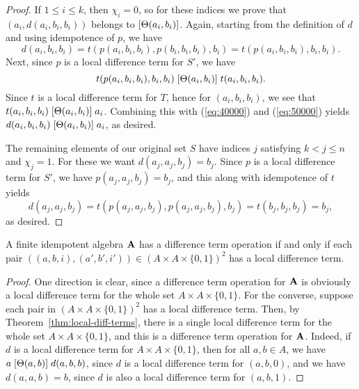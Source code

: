 \begin{proof}
If $1\leq i \leq k$, then $\chi_i =0$, so for these indices we prove
that $(a_i, d(a_i,b_i,b_i))$ belongs to $[\Theta(a_i,b_i)]$.
Again, starting from the definition of $d$ and using idempotence of $p$, we have
\begin{equation}
  \label{eq:40000}
  d(a_i,b_i,b_i) =
  t(p(a_i,b_i,b_i), p(b_i,b_i,b_i), b_i)=
  t(p(a_i,b_i,b_i), b_i, b_i).
\end{equation}
Next, since $p$ is a local difference term for $S'$, we have
\begin{equation}
  \label{eq:50000}
  t(p(a_i,b_i,b_i), b_i, b_i)
 \Comr{\Cg(a_i,b_i)}
 t(a_i, b_i, b_i).
\end{equation}
Since $t$ is a local difference term for $T$, hence for
$(a_i, b_i, b_i)$,  %
we see that 
$t(a_i, b_i, b_i) \mathrel{[\Theta(a_i,b_i)]} a_i$.
Combining this with (\ref{eq:40000}) and (\ref{eq:50000}) yields
$d(a_i,b_i,b_i) \mathrel{[\Theta(a_i,b_i)]} a_i$,
as desired.

The remaining elements of our original set $S$
have indices $j$ satisfying $k<j\leq n$ and $\chi_j = 1$.
For these we want $d(a_j,a_j,b_j) = b_j$.
Since $p$ is a local difference term for $S'$, we have
$p(a_j,a_j,b_j) = b_j$, and this along with idempotence of $t$ yields
\[ d(a_j,a_j,b_j) =  t(p(a_j,a_j,b_j), p(a_j,a_j,b_j), b_j)=  t(b_j, b_j, b_j) =b_j,\]
as desired.
\end{proof}

\begin{cor}
  \label{cor:loc-diff-term}
  A finite idempotent algebra $\mathbf{A}$ has a difference term operation if and
  only if each pair $((a,b,i), (a',b',i')) \in (A\times A \times \{0,1\})^2$ has a local
  difference term.
\end{cor}
\begin{proof}
  One direction is clear, since a difference term operation for $\mathbf{A}$ is
  obviously a local difference term for the whole set 
  $A\times A \times \{0,1\}$.
  For the converse, suppose
  each pair in $(A\times A \times \{0,1\})^2$ has a local
  difference term. Then, by Theorem~\ref{thm:local-diff-terms},
  there is a single local difference term for the whole set $A\times A \times \{0,1\}$,
  and this is a difference term operation for $\mathbf{A}$.  Indeed, if $d$ is a
  local difference term for $A\times A \times \{0,1\}$, then 
  for all $a, b \in A$, we have
  $a \mathrel{[\Theta(a,b)]} d(a,b,b)$,
  since $d$ is a local difference term for $(a,b,0)$, and we have
  $d(a,a,b) = b$, since $d$ is also a local difference term for
  $(a,b,1)$.
\end{proof}

